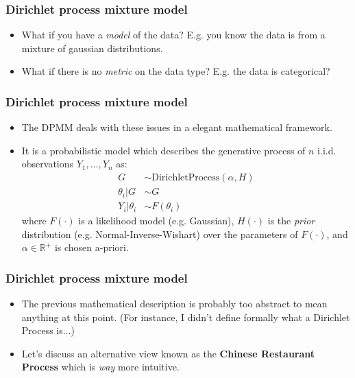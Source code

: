 \documentclass{beamer}
\newcommand{\R}{\ensuremath{\mathbb{R}}}
\begin{document}
\begin{frame}
\frametitle{Dirichlet process mixture model}
\begin{itemize}
  \item What if you have a \emph{model} of the data? E.g. you know the 
    data is from a mixture of gaussian distributions.

  \item What if there is no \emph{metric} on the data type? E.g. the data is
    categorical?
\end{itemize}
\end{frame}


\begin{frame}
\frametitle{Dirichlet process mixture model}
\begin{itemize}[<+->]
  \item The DPMM deals with these issues in a elegant mathematical framework.
  \item It is a probabilistic model which describes the generative process
    of $n$ i.i.d. observations $Y_1, ..., Y_n$ as:
    \begin{align*}
      G &\sim \text{DirichletProcess}(\alpha, H) \\
      \theta_i | G &\sim G \\
      Y_i | \theta_i &\sim F(\theta_i)
    \end{align*}
    where $F(\cdot)$ is a likelihood model (e.g. Gaussian),  $H(\cdot)$ is the
    \emph{prior} distribution (e.g. Normal-Inverse-Wishart) over the parameters
    of $F(\cdot)$, and $\alpha \in \R^{+}$ is chosen a-priori.
\end{itemize}
\end{frame}


\begin{frame}
\frametitle{Dirichlet process mixture model}
\begin{itemize}[<+->]
  \item The previous mathematical description is probably too abstract to mean
    anything at this point. (For instance, I didn't define formally what a 
    Dirichlet Process is...)
  \item Let's discuss an alternative view known as the 
    \textbf{Chinese Restaurant Process} which is \emph{way} more intuitive.
\end{itemize}
\end{frame}
\end{document}
